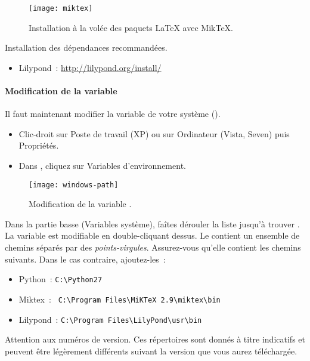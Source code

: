 \begin{figure}
  \centering
  \texttt{[image: miktex]}
  \caption{Installation {\og}à la volée{\fg} des paquets \LaTeX{} avec
    MikTeX.}
  \label{fig:miktex}
\end{figure}


Installation des dépendances recommandées.
\begin{itemize} 
\item Lilypond~: \url{http://lilypond.org/install/}
\end{itemize}


\paragraph{Modification de la variable }

Il faut maintenant modifier la variable  de votre
système ().
\begin{itemize}
\item Clic-droit sur Poste de travail (XP) ou sur Ordinateur (Vista,
  Seven) puis Propriétés.
\item Dans , cliquez sur Variables
  d'environnement.
\end{itemize}

\begin{figure}
  \centering
  \texttt{[image: windows-path]}
  \caption{Modification de la variable .}
  \label{fig:windows-path}
\end{figure}


Dans la partie basse (Variables système), faîtes dérouler la liste
jusqu'à trouver . La variable est modifiable en
double-cliquant dessus. Le  contient un ensemble de
chemins séparés par des \emph{points-virgules}. Assurez-vous qu'elle
contient les chemins suivants. Dans le cas contraire, ajoutez-les~:
\begin{itemize}
\item Python~: \verb#C:\Python27#
\item Miktex~: \verb# C:\Program Files\MiKTeX 2.9\miktex\bin#
\item Lilypond~: \verb#C:\Program Files\LilyPond\usr\bin#
\end{itemize}                     

\begin{nota}
Attention aux numéros de version. Ces répertoires sont donnés à titre
indicatifs et peuvent être légèrement différents suivant la version
que vous aurez téléchargée.
\end{nota}

